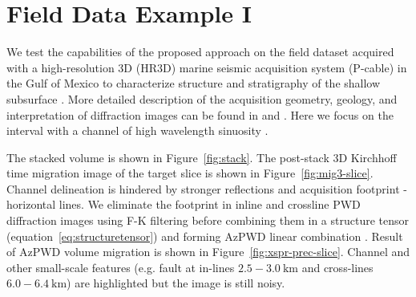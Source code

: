 
\section{Field Data Example I}

We test the capabilities of the proposed approach on the field dataset acquired with a high-resolution 3D (HR3D)
marine seismic acquisition system (P-cable) in the Gulf of Mexico to characterize structure and stratigraphy of
the shallow subsurface \cite[]{meckel2016use,klokov2017diffraction,merzlikin2017diffraction,sgreer18}.
 More detailed description of the acquisition geometry, geology, and interpretation of diffraction images can be found in
\cite{klokov2017diffraction} and \cite{merzlikin2017diffraction}.
Here we focus on the interval with a channel of high wavelength sinuosity \cite[]{merzlikin2017diffraction}.

The stacked volume is shown in Figure~\ref{fig:stack}.
The post-stack 3D Kirchhoff time migration image of the target slice is shown in Figure~\ref{fig:mig3-slice}.
Channel delineation is hindered by stronger reflections and acquisition footprint - horizontal lines. 
We eliminate the footprint in inline and crossline PWD diffraction images using F-K filtering before
combining them in a structure tensor (equation~\ref{eq:structuretensor}) and forming AzPWD linear combination \cite[]{merzlikin2017diffraction}.
Result of AzPWD volume migration is shown in Figure~\ref{fig:xspr-prec-slice}.
Channel and other small-scale features (e.g. fault at in-lines $2.5-3.0\ \text{km}$ and cross-lines $6.0-6.4\ \text{km}$) are highlighted but the image is still noisy.

